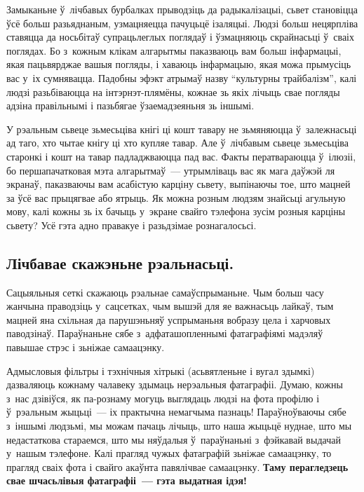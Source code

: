 
Замыканьне ў~лічбавых бурбалках прыводзіць да радыкалізацыі, сьвет становіцца ўсё больш разьяднаным, узмацняецца пачуцьцё ізаляцыі. Людзі больш нецярпліва ставяцца да носьбітаў супрацьлеглых поглядаў і ўзмацняюць скрайнасьці ў~сваіх поглядах. Бо з~кожным клікам алгарытмы паказваюць вам больш інфармацыі, якая пацьвярджае вашыя погляды, і хаваюць інфармацыю, якая можа прымусіць вас у~іх сумнявацца. Падобны эфэкт атрымаў назву ``культурны трайбалізм'', калі людзі разьбіваюцца на інтэрнэт-плямёны, кожнае зь якіх лічыць свае погляды адзіна правільнымі і пазьбягае ўзаемадзеяньня зь іншымі.

У рэальным сьвеце зьмесьціва кнігі ці кошт тавару не зьмяняюцца ў~залежнасьці ад таго, хто чытае кнігу ці хто купляе тавар. Але ў~лічбавым сьвеце зьмесьціва старонкі і кошт на тавар падладжваюцца пад вас. Факты ператвараюцца ў~ілюзіі, бо першапачатковая мэта алгарытмаў~--- утрымліваць вас як мага даўжэй ля экранаў, паказваючы вам асабістую карціну сьвету, выпінаючы тое, што мацней за ўсё вас прыцягвае або ятрыць. Як можна розным людзям знайсьці агульную мову, калі кожны зь іх бачыць у~экране свайго тэлефона зусім розныя карціны сьвету? Усё гэта адно правакуе і разьдзімае рознагалосьсі.

\subsection*{Лічбавае скажэньне рэальнасьці.}

Сацыяльныя сеткі скажаюць рэальнае самаўспрыманьне. Чым больш часу жанчына праводзіць у~сацсетках, чым вышэй для яе важнасьць лайкаў, тым мацней яна схільная да парушэньняў успрыманьня вобразу цела і харчовых паводзінаў. Параўнаньне сябе з~адфаташопленнымі фатаграфіямі мадэляў павышае стрэс і зьніжае самаацэнку.

Адмысловыя фільтры і тэхнічныя хітрыкі (асьвятленьне і вугал здымкі) дазваляюць кожнаму чалавеку здымаць нерэальныя фатаграфіі. Думаю, кожны з~нас дзівіўся, як па-рознаму могуць выглядаць людзі на фота профілю і ў~рэальным жыцьці~--- іх практычна немагчыма пазнаць! Параўноўваючы сябе з~іншымі людзьмі, мы можам пачаць лічыць, што наша жыцьцё нуднае, што мы недастаткова стараемся, што мы няўдалыя ў~параўнаньні з~фэйкавай выдачай у~нашым тэлефоне. Калі прагляд чужых фатаграфій зьніжае самаацэнку, то прагляд сваіх фота і свайго акаўнта павялічвае самаацэнку. \textbf{Таму перагледзець свае шчасьлівыя фатаграфіі~--- гэта выдатная ідэя!}


